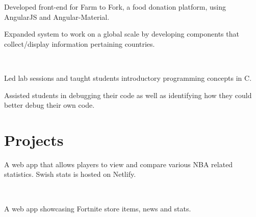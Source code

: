 \documentclass[]{chris_katsaras_resume}
\begin{document}
\begin{minipage}[t]{1\textwidth}
\begin{tightemize}
\item Developed front-end for Farm to Fork, a food donation platform, using AngularJS and Angular-Material. \item Expanded system to work on a global scale by developing components that collect/display information pertaining countries.  \end{tightemize}
\sectionsep

\\
\begin{tightemize}
\item Led lab sessions and taught students introductory programming concepts in C.\item Assisted students in debugging their code as well as identifying how they could better
debug their own code.
\end{tightemize}

\sectionsep


\section{Projects}
\vspace{2mm}
\begin{tightemize}
\item A web app that allows players to view and compare various NBA related statistics. 
Swish stats is hosted on Netlify.
\end{tightemize}

\sectionsep

\\
\vspace{2mm}
\begin{tightemize}
\item A web app showcasing Fortnite store items, news and stats.
\end{tightemize}

\sectionsep


\end{minipage}
\end{document}
